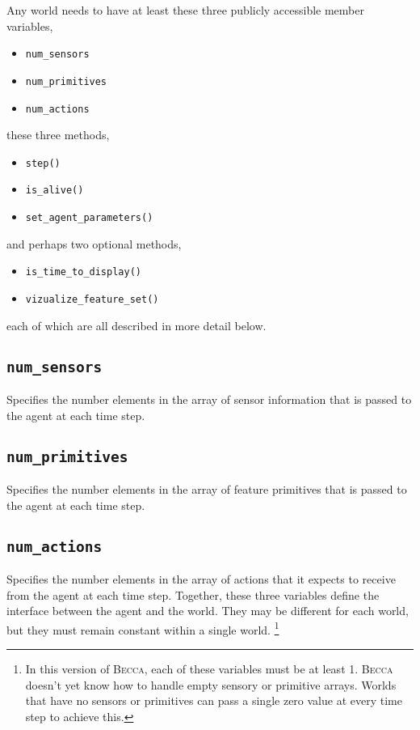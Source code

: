 Any world needs to have at least these three publicly accessible member variables,

\begin{itemize}
\item{\texttt{num\_sensors}}
\item{\texttt{num\_primitives}}
\item{\texttt{num\_actions}}
\end{itemize}

these three methods,

\begin{itemize}
\item{\texttt{step()}}
\item{\texttt{is\_alive()}}
\item{\texttt{set\_agent\_parameters()}}
\end{itemize}

and perhaps two optional methods,

\begin{itemize}
\item{\texttt{is\_time\_to\_display()}}
\item{\texttt{vizualize\_feature\_set()}}
\end{itemize}

each of which are all described in more detail below.

\subsection{\texttt{num\_sensors}}
Specifies the number elements in the array of sensor information that is passed to the agent at each time step.

\subsection{\texttt{num\_primitives}}
Specifies the number elements in the array of feature primitives that is passed to the agent at each time step.

\subsection{\texttt{num\_actions}}
Specifies the number elements in the array of actions that it expects to receive from the agent at each time step. Together, these three variables define the interface between the agent and the world. They may be different for each world, but they must remain constant within a single world. \footnote{In this version of \textsc{Becca}, each of these variables must be at least 1. \textsc{Becca} doesn't yet know how to handle empty sensory or primitive arrays. Worlds that have no sensors or primitives can pass a single zero value at every time step to achieve this.}

